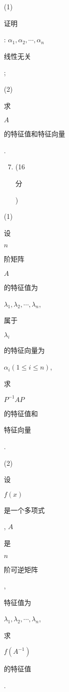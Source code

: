 \documentclass[10pt]{article}
\begin{document}
(1) \begin{CJK}{UTF8}{mj}证明\end{CJK}: $\alpha_{1}, \alpha_{2}, \cdots, \alpha_{n}$ \begin{CJK}{UTF8}{mj}线性无关\end{CJK};

(2) \begin{CJK}{UTF8}{mj}求\end{CJK} $A$ \begin{CJK}{UTF8}{mj}的特征值和特征向量\end{CJK}.

\begin{enumerate}
  \setcounter{enumi}{6}
  \item (16 \begin{CJK}{UTF8}{mj}分\end{CJK})
\end{enumerate}
(1) \begin{CJK}{UTF8}{mj}设\end{CJK} $n$ \begin{CJK}{UTF8}{mj}阶矩阵\end{CJK} $A$ \begin{CJK}{UTF8}{mj}的特征值为\end{CJK} $\lambda_{1}, \lambda_{2}, \cdots, \lambda_{n}$, \begin{CJK}{UTF8}{mj}属于\end{CJK} $\lambda_{i}$ \begin{CJK}{UTF8}{mj}的特征向量为\end{CJK} $\alpha_{i}(1 \leqslant i \leqslant n)$, \begin{CJK}{UTF8}{mj}求\end{CJK} $P^{-1} A P$ \begin{CJK}{UTF8}{mj}的特征值和\end{CJK} \begin{CJK}{UTF8}{mj}特征向量\end{CJK}.

(2) \begin{CJK}{UTF8}{mj}设\end{CJK} $f(x)$ \begin{CJK}{UTF8}{mj}是一个多项式\end{CJK}, $A$ \begin{CJK}{UTF8}{mj}是\end{CJK} $n$ \begin{CJK}{UTF8}{mj}阶可逆矩阵\end{CJK}, \begin{CJK}{UTF8}{mj}特征值为\end{CJK} $\lambda_{1}, \lambda_{2}, \cdots, \lambda_{n}$, \begin{CJK}{UTF8}{mj}求\end{CJK} $f\left(A^{-1}\right)$ \begin{CJK}{UTF8}{mj}的特征值\end{CJK}.
\end{document}
